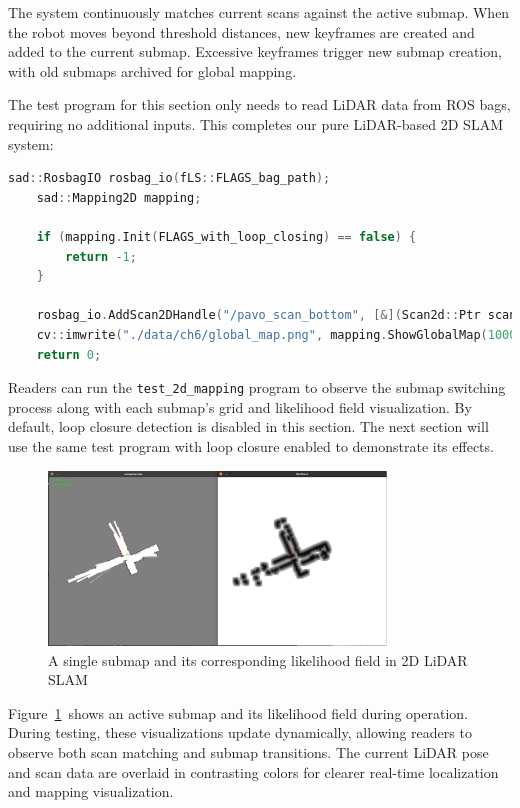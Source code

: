 The system continuously matches current scans against the active submap. When the robot moves beyond threshold distances, new keyframes are created and added to the current submap. Excessive keyframes trigger new submap creation, with old submaps archived for global mapping.

The test program for this section only needs to read LiDAR data from ROS bags, requiring no additional inputs. This completes our pure LiDAR-based 2D SLAM system:
\begin{lstlisting}[language=c++,caption=src/ch6/test_2d_mapping.cc]
	sad::RosbagIO rosbag_io(fLS::FLAGS_bag_path);
	sad::Mapping2D mapping;
	
	if (mapping.Init(FLAGS_with_loop_closing) == false) {
		return -1;
	}
	
	rosbag_io.AddScan2DHandle("/pavo_scan_bottom", [&](Scan2d::Ptr scan) { return mapping.ProcessScan(scan); }).Go();
	cv::imwrite("./data/ch6/global_map.png", mapping.ShowGlobalMap(1000));
	return 0;
\end{lstlisting}

Readers can run the \texttt{test\_2d\_mapping} program to observe the submap switching process along with each submap's grid and likelihood field visualization. By default, loop closure detection is disabled in this section. The next section will use the same test program with loop closure enabled to demonstrate its effects.

\begin{figure}[!htp]
	\centering
	\includegraphics[width=0.8\textwidth]{resources/2d-lidar-mapping/submap-and-field.png}
	\caption{A single submap and its corresponding likelihood field in 2D LiDAR SLAM}
	\label{fig:submap-and-field}
\end{figure}

Figure~\ref{fig:submap-and-field}~shows an active submap and its likelihood field during operation. During testing, these visualizations update dynamically, allowing readers to observe both scan matching and submap transitions. The current LiDAR pose and scan data are overlaid in contrasting colors for clearer real-time localization and mapping visualization.

